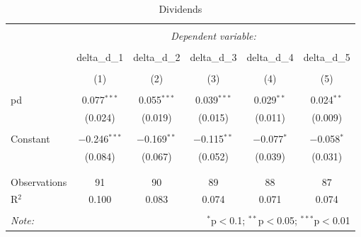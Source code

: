 
\begin{table}[!htbp] \centering 
  \caption{Dividends} 
  \label{} 
\begin{tabular}{@{\extracolsep{5pt}}lccccc} 
\\[-1.8ex]\hline 
\hline \\[-1.8ex] 
 & \multicolumn{5}{c}{\textit{Dependent variable:}} \\ 
\cline{2-6} 
\\[-1.8ex] & delta\_d\_1 & delta\_d\_2 & delta\_d\_3 & delta\_d\_4 & delta\_d\_5 \\ 
\\[-1.8ex] & (1) & (2) & (3) & (4) & (5)\\ 
\hline \\[-1.8ex] 
 pd & 0.077$^{***}$ & 0.055$^{***}$ & 0.039$^{***}$ & 0.029$^{**}$ & 0.024$^{**}$ \\ 
  & (0.024) & (0.019) & (0.015) & (0.011) & (0.009) \\ 
  & & & & & \\ 
 Constant & $-$0.246$^{***}$ & $-$0.169$^{**}$ & $-$0.115$^{**}$ & $-$0.077$^{*}$ & $-$0.058$^{*}$ \\ 
  & (0.084) & (0.067) & (0.052) & (0.039) & (0.031) \\ 
  & & & & & \\ 
\hline \\[-1.8ex] 
Observations & 91 & 90 & 89 & 88 & 87 \\ 
R$^{2}$ & 0.100 & 0.083 & 0.074 & 0.071 & 0.074 \\ 
\hline 
\hline \\[-1.8ex] 
\textit{Note:}  & \multicolumn{5}{r}{$^{*}$p$<$0.1; $^{**}$p$<$0.05; $^{***}$p$<$0.01} \\ 
\end{tabular} 
\end{table} 
